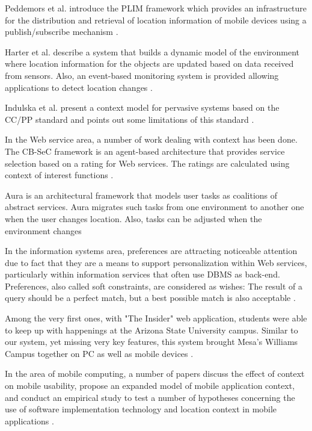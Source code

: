 \documentclass{acm_proc_article-sp}
\begin{document}
Peddemors et al. introduce the PLIM framework which provides an infrastructure for the distribution and retrieval of location information of mobile devices using a publish/subscribe mechanism \cite{peddemors:lbs}.

Harter et al. describe a system that builds a dynamic model of the environment where location information for the objects are updated based on data received from sensors. Also, an event-based monitoring system is provided allowing applications to detect location changes \cite{harter:anatomy}. 

Indulska et al. present a context model for pervasive systems based on the CC/PP standard and points out some limitations of this standard  \cite{indulska:ccpp}.

In the Web service area, a number of work dealing with context has been done. The CB-SeC framework is an agent-based architecture that provides service selection based on a rating for Web services. The ratings are calculated using context of interest functions \cite{maamar:contextualisation}. 

Aura is an architectural framework that models user tasks as coalitions of abstract services. Aura migrates such tasks from one environment to another one when the user changes location. Also, tasks can be adjusted when the environment changes \cite{sousa:mobility}

In the information systems area, preferences are attracting noticeable attention due to fact that they are a means to support personalization within Web services, particularly within information services that often use DBMS as back-end. Preferences, also called soft constraints, are considered as wishes: The result of a query should be a perfect match, but a best possible match is also acceptable \cite{kießling:optimizing,agrawal:preferences,chomicki:intrinsic}.

Among the very first ones, with "The Insider" web application, students were able to keep up with happenings at the Arizona State University campus. Similar to our system, yet missing very key features, this system brought Mesa's Williams Campus together on PC as well as mobile devices \cite{valenzuela:insider,gellersen:multisensor}.

In the area of mobile computing, a number of papers discuss the effect of context on mobile usability, propose an expanded model of mobile application context, and conduct an empirical study to test a number of hypotheses concerning the use of software implementation technology and location context in mobile applications \cite{ryan:mobile}.
\end{document}
